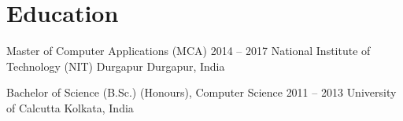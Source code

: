 \section{Education}
  \resumeSubHeadingListStart
    \resumeSubheading
      {Master of Computer Applications (MCA)} {2014 -- 2017}
      {National Institute of Technology (NIT) Durgapur} {Durgapur, India}
    
    \resumeSubheading
      {Bachelor of Science (B.Sc.) (Honours), Computer Science} {2011 -- 2013}
      {University of Calcutta} {Kolkata, India}
  \resumeSubHeadingListEnd